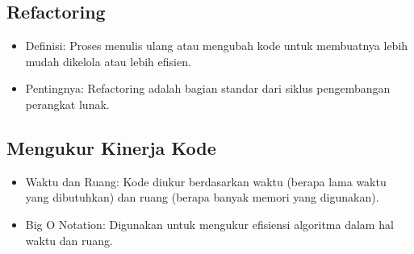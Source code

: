 \documentclass{article}
\begin{document}
\subsection{Refactoring}
\begin{itemize}
    \item Definisi: Proses menulis ulang atau mengubah kode untuk membuatnya lebih mudah dikelola atau lebih efisien.
    \item Pentingnya: Refactoring adalah bagian standar dari siklus pengembangan perangkat lunak.
\end{itemize}

\subsection{Mengukur Kinerja Kode}
\begin{itemize}
    \item Waktu dan Ruang: Kode diukur berdasarkan waktu (berapa lama waktu yang dibutuhkan) dan ruang (berapa banyak memori yang digunakan).
    \item Big O Notation: Digunakan untuk mengukur efisiensi algoritma dalam hal waktu dan ruang.
\end{itemize}
\end{document}
